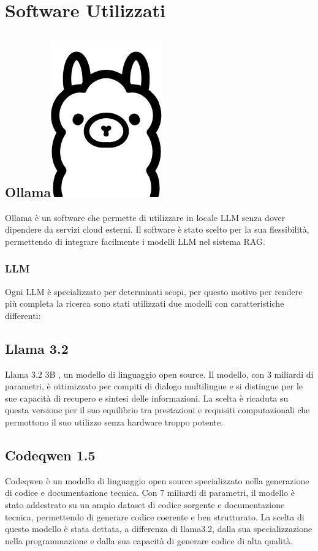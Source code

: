\documentclass[12pt,a4paper,openright,twoside]{book}
\begin{document}
\section{Software Utilizzati}
\subsection{Ollama\hspace{0.3cm}\protect\includegraphics[width=0.03\linewidth]{figures/ollama.png}}
Ollama \cite{ollama-docs} è un software che permette di utilizzare in locale LLM
senza dover dipendere da servizi cloud esterni.
Il software è stato scelto per la sua flessibilità, permettendo di integrare facilmente i modelli LLM nel sistema RAG.
\subsubsection{LLM}
Ogni LLM è specializzato per determinati scopi,
per questo motivo per rendere più completa la ricerca sono stati utilizzati due modelli con caratteristiche differenti:
\subsection{Llama 3.2}
Llama 3.2 3B \cite{llama3-2}, un modello di linguaggio open source.
Il modello, con 3 miliardi di parametri, è ottimizzato per compiti di dialogo multilingue e si distingue per le sue capacità di recupero e sintesi delle informazioni.
La scelta è ricaduta su questa versione per il suo equilibrio tra prestazioni e requisiti computazionali che permottono il suo utilizzo senza hardware troppo potente.

\subsection{Codeqwen 1.5}
Codeqwen \cite{codeqwen1.5} è un modello di linguaggio open source specializzato nella generazione di codice e documentazione tecnica.  
Con 7 miliardi di parametri, il modello è stato addestrato su un ampio dataset di codice sorgente e documentazione tecnica, permettendo di generare codice coerente e ben strutturato.
La scelta di questo modello è stata dettata, a differenza di llama3.2, dalla sua specializzazione nella programmazione e dalla sua capacità di generare codice di alta qualità. 
\end{document}
